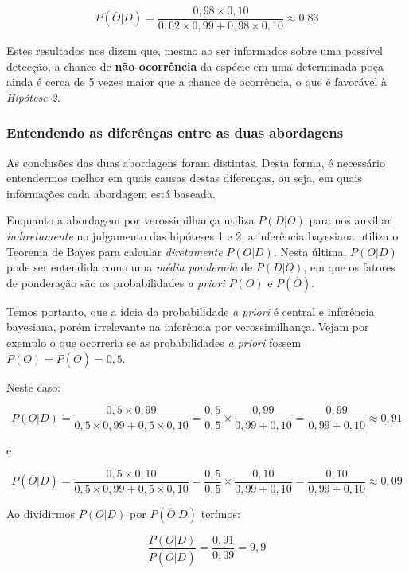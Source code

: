 \documentclass[
]{book}
\begin{document}
\[P(\bar{O}|D) = \frac{0,98 \times 0,10}{0,02 \times 0,99 + 0,98 \times 0,10} \approx 0.83\]

Estes resultados nos dizem que, mesmo ao ser informados sobre uma possível detecção, a chance de \textbf{não-ocorrência} da espécie em uma determinada poça ainda é cerca de 5 vezes maior que a chance de ocorrência, o que é favorável à \emph{Hipótese 2}.

\hypertarget{entendendo-as-diferuxeanuxe7as-entre-as-duas-abordagens}{%
\subsubsection*{Entendendo as diferênças entre as duas abordagens}\label{entendendo-as-diferuxeanuxe7as-entre-as-duas-abordagens}}

As conclusões das duas abordagens foram distintas. Desta forma, é necessário entendermos melhor em quais causas destas diferenças, ou seja, em quais informações cada abordagem está baseada.

Enquanto a abordagem por verossimilhança utiliza \(P(D|O)\) para nos auxiliar \emph{indiretamente} no julgamento das hipóteses 1 e 2, a inferência bayesiana utiliza o Teorema de Bayes para calcular \emph{diretamente} \(P(O|D)\). Nesta última, \(P(O|D)\) pode ser entendida como uma \emph{média ponderada} de \(P(D|O)\), em que os fatores de ponderação são as probabilidades \emph{a priori} \(P(O)\) e \(P(\overline{O})\).

Temos portanto, que a ideia da probabilidade \emph{a priori} é central e inferência bayesiana, porém irrelevante na inferência por verossimilhança. Vejam por exemplo o que ocorreria se as probabilidades \emph{a priori} fossem \(P(O) = P(\overline{O}) = 0,5\).

Neste caso:

\[P(O|D) = \frac{0,5 \times 0,99}{0,5 \times 0,99 + 0,5 \times 0,10} = \frac{0,5}{0,5} \times \frac{0,99}{0,99 + 0,10} = \frac{0,99}{0,99 + 0,10} \approx 0,91 \]

e

\[P(\overline{O}|D) = \frac{0,5 \times 0,10}{0,5 \times 0,99 + 0,5 \times 0,10} = \frac{0,5}{0,5} \times \frac{0,10}{0,99 + 0,10} = \frac{0,10}{0,99 + 0,10} \approx 0,09 \]

Ao dividirmos \(P(O|D)\) por \(P(\overline{O}|D)\) terímos:

\[\frac{P(O|D)}{P(\overline{O}|D)} = \frac{0,91}{0,09} = 9,9\]
\end{document}
